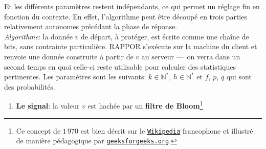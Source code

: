 \documentclass[a4paper,11pt]{article} %
\newcommand{\www}[2]{\href{#1}{\nolinkurl{#2}}}
\begin{document}
Et les différents paramètres restent indépendants, ce qui permet un réglage fin en fonction du contexte. En effet, l'algorithme peut être découpé en trois parties relativement autonomes précédant la phase de réponse.\\[-0.4em] 

\emph{Algorithme}: la donnée $v$ de départ, à protéger, est écrite comme une chaîne de bits, sans contrainte particulière. RAPPOR s'exécute sur la machine du client et renvoie une donnée construite à partir de $v$ au serveur ---~on verra dans un second temps en quoi celle-ci reste utilisable pour calculer des statistiques pertinentes. 
Les paramètres sont les suivants:  $k\in\mathbb{N}^*$, $h\in\mathbb{N}^*$ et $f$, $p$, $q$ qui sont des probabilités.
\begin{enumerate}
    \item 
    \textbf{Le signal}: la valeur $v$ est hachée par un \textbf{filtre de Bloom}\footnote{Ce concept de $1\,970$ est bien décrit sur le \www{https://fr.wikipedia.org/wiki/Filtre_de_Bloom}{Wikipedia} francophone et illustré de manière pédagogique par \www{https://www.geeksforgeeks.org/bloom-filters-introduction-and-python-implementation/}{geeksforgeeks.org}.
     
}
\end{enumerate}
\end{document}
